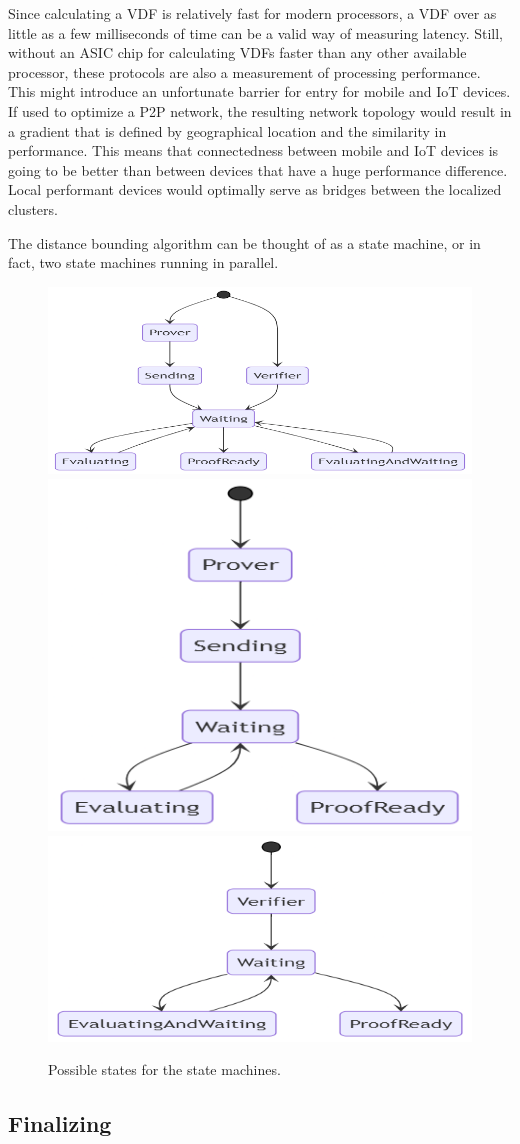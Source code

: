 Since calculating a VDF is relatively fast for modern processors, a VDF over as little as a few milliseconds of time can be a valid way of measuring latency. Still, without an ASIC chip for calculating VDFs faster than any other available processor, these protocols are also a measurement of processing performance. This might introduce an unfortunate barrier for entry for mobile and IoT devices. If used to optimize a P2P network, the resulting network topology would result in a gradient that is defined by geographical location and the similarity in performance. This means that connectedness between mobile and IoT devices is going to be better than between devices that have a huge performance difference. Local performant devices would optimally serve as bridges between the localized clusters.

The distance bounding algorithm can be thought of as a state machine, or in fact, two state machines running in parallel.

\begin{figure}[htp]

	\centering
	\includegraphics[width=.3\textwidth]{pictures/mermaid-diagram-20210505012010.png}\hfill
	\includegraphics[width=.3\textwidth]{pictures/mermaid-diagram-20210505014229.png}\hfill
	\includegraphics[width=.3\textwidth]{pictures/mermaid-diagram-20210505015712.png}

	\caption{Possible states for the state machines.}
	\label{Protocol States}

\end{figure}

\subsection{Finalizing}
